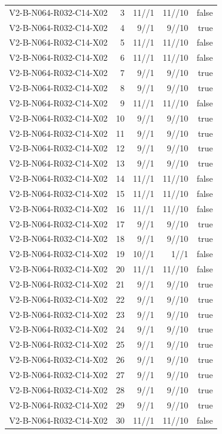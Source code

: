 {\begin{longtable}{lrrrr}
V2-B-N064-R032-C14-X02 & 3 & 11//1 & 11//10 & false \\
V2-B-N064-R032-C14-X02 & 4 & 9//1 & 9//10 & true \\
V2-B-N064-R032-C14-X02 & 5 & 11//1 & 11//10 & false \\
V2-B-N064-R032-C14-X02 & 6 & 11//1 & 11//10 & false \\
V2-B-N064-R032-C14-X02 & 7 & 9//1 & 9//10 & true \\
V2-B-N064-R032-C14-X02 & 8 & 9//1 & 9//10 & true \\
V2-B-N064-R032-C14-X02 & 9 & 11//1 & 11//10 & false \\
V2-B-N064-R032-C14-X02 & 10 & 9//1 & 9//10 & true \\
V2-B-N064-R032-C14-X02 & 11 & 9//1 & 9//10 & true \\
V2-B-N064-R032-C14-X02 & 12 & 9//1 & 9//10 & true \\
V2-B-N064-R032-C14-X02 & 13 & 9//1 & 9//10 & true \\
V2-B-N064-R032-C14-X02 & 14 & 11//1 & 11//10 & false \\
V2-B-N064-R032-C14-X02 & 15 & 11//1 & 11//10 & false \\
V2-B-N064-R032-C14-X02 & 16 & 11//1 & 11//10 & false \\
V2-B-N064-R032-C14-X02 & 17 & 9//1 & 9//10 & true \\
V2-B-N064-R032-C14-X02 & 18 & 9//1 & 9//10 & true \\
V2-B-N064-R032-C14-X02 & 19 & 10//1 & 1//1 & false \\
V2-B-N064-R032-C14-X02 & 20 & 11//1 & 11//10 & false \\
V2-B-N064-R032-C14-X02 & 21 & 9//1 & 9//10 & true \\
V2-B-N064-R032-C14-X02 & 22 & 9//1 & 9//10 & true \\
V2-B-N064-R032-C14-X02 & 23 & 9//1 & 9//10 & true \\
V2-B-N064-R032-C14-X02 & 24 & 9//1 & 9//10 & true \\
V2-B-N064-R032-C14-X02 & 25 & 9//1 & 9//10 & true \\
V2-B-N064-R032-C14-X02 & 26 & 9//1 & 9//10 & true \\
V2-B-N064-R032-C14-X02 & 27 & 9//1 & 9//10 & true \\
V2-B-N064-R032-C14-X02 & 28 & 9//1 & 9//10 & true \\
V2-B-N064-R032-C14-X02 & 29 & 9//1 & 9//10 & true \\
V2-B-N064-R032-C14-X02 & 30 & 11//1 & 11//10 & false \\

\end{longtable}}
